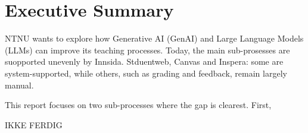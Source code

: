 \section{Executive Summary}

NTNU wants to explore how Generative AI (GenAI) and Large Language Models (LLMs) can improve its teaching processes. Today, the main sub-prosesses are suopported unevenly by Innsida. Stduentweb, Canvas and Inspera: some are system-supported, while others, such as grading and feedback, remain largely manual.

This report focuses on two sub-processes where the gap is clearest. First, 

IKKE FERDIG